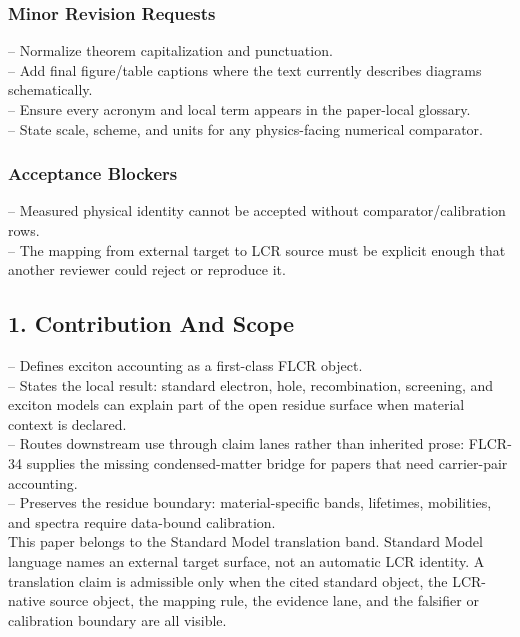\documentclass[11pt]{article}
\begin{document}
\subsubsection*{Minor Revision Requests}

\noindent{}-- Normalize theorem capitalization and punctuation.\\
\noindent{}-- Add final figure/table captions where the text currently describes diagrams schematically.\\
\noindent{}-- Ensure every acronym and local term appears in the paper-local glossary.\\
\noindent{}-- State scale, scheme, and units for any physics-facing numerical comparator.\\

\subsubsection*{Acceptance Blockers}

\noindent{}-- Measured physical identity cannot be accepted without comparator/calibration rows.\\
\noindent{}-- The mapping from external target to LCR source must be explicit enough that another reviewer could reject or reproduce it.\\


\subsection*{1. Contribution And Scope}

\noindent{}-- Defines exciton accounting as a first-class FLCR object.\\
\noindent{}-- States the local result: standard electron, hole, recombination, screening, and exciton models can explain part of the open residue surface when material context is declared.\\
\noindent{}-- Routes downstream use through claim lanes rather than inherited prose: FLCR-34 supplies the missing condensed-matter bridge for papers that need carrier-pair accounting.\\
\noindent{}-- Preserves the residue boundary: material-specific bands, lifetimes, mobilities, and spectra require data-bound calibration.\\

This paper belongs to the Standard Model translation band. Standard Model language names an external target surface, not an automatic LCR identity. A translation claim is admissible only when the cited standard object, the LCR-native source object, the mapping rule, the evidence lane, and the falsifier or calibration boundary are all visible.
\end{document}
